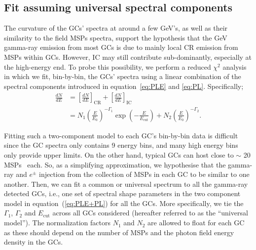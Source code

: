 \documentclass[doublespace,nopageskip]{VTthesis} %
\begin{document}
\subsection{Fit assuming universal spectral components}\label{sec:spectra_global}

The curvature of the GCs' spectra at around a few GeV's, as well as their similarity to the field MSPs spectra, support the hypothesis that the GeV gamma-ray emission from most GCs is due to mainly local CR emission from MSPs within GCs. However, IC may still contribute sub-dominantly, especially at the high-energy end. To probe this possibility, we perform a reduced $\chi^2$ analysis in which we fit, bin-by-bin, the  GCs' spectra using a linear combination of the spectral components introduced in equation~\ref{eq:PLE} and \ref{eq:PL}. Specifically;
\begin{align}\label{eq:PLE+PL}
    \frac{dN}{dE} &= \left[ \frac{dN}{dE} \right]_\mathrm{CR} + \left[ \frac{dN}{dE} \right]_\mathrm{IC} \\\nonumber
    &= N_1\left( \frac{E}{E_0} \right)^{-\Gamma_1}\exp\left(-\frac{E}{E_\mathrm{cut}}\right) + N_2\left(\frac{E}{E_0}\right)^{-\Gamma_2}.
\end{align}

Fitting such a two-component model to each GC's bin-by-bin data is difficult since the GC spectra only contains 9 energy bins, and many high energy bins only provide upper limits. On the other hand, typical GCs can host close to $\sim$ 20 MSPs~\citep{2019ApJ...877..122Y} each. So, as a simplifying approximation, we hypothesise that the gamma-ray and $e^\pm$ injection from the collection of MSPs in each GC to be similar to one another. Then, we can fit a common or universal spectrum to all the gamma-ray detected GCs, i.e., one set of spectral shape parameters in the two component model in equation~(\ref{eq:PLE+PL}) for all the GCs. More specifically, we tie the $\Gamma_1$, $\Gamma_2$ and $E_\mathrm{cut}$ across all GCs considered (hereafter referred to as the ``universal model''). The normalization factors $N_1$ and $N_2$ are allowed to float for each GC as these should depend on the number of MSPs and the photon field energy density in the GCs.
\end{document}
